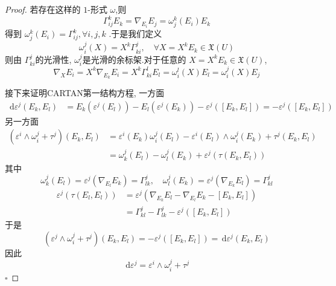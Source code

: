 \documentclass[../../几何与拓扑.tex]{subfiles}
\begin{document}
\begin{proof}
    若存在这样的 \(  1  \)-形式 \(   \omega   \),则 \[
   \Gamma _{ij}^{k}E_{k}=    \nabla _{E_{i}}E_{j}=  \omega _{j}^{k}\left( E_{i} \right)E_{k} 
    \]  得到 \(   \omega _{j}^{k}\left( E_{i} \right)=  \Gamma _{ij}^{k},\forall i,j,k   \) .于是我们定义 \[
     \omega _{i}^{j}\left( X \right)=X^{k} \Gamma _{ki}^{j},\quad \forall X = X^{k}E_{k} \in \mathfrak{X}\left( U \right) 
    \]则由 \(   \Gamma _{ki}^{j}  \)的光滑性, \(   \omega _{i}^{j}  \)是光滑的余标架.对于任意的 \(  X =  X^{k}E_{k} \in \mathfrak{X}\left( U \right)   \), \[
     \nabla _{X}E_{i}= X^{k} \nabla _{E_{k}}E_{i}= X^{k} \Gamma _{ki}^{l}E_{l}=  \omega _{i}^{l}\left( X \right)E_{l}=  \omega _{i}^{j}\left( X \right) E_{j} 
    \]   

    接下来证明CARTAN第一结构方程, 一方面 \[
    \begin{aligned}
    \,\mathrm{d}  \varepsilon ^{j}\left( E_{k},E_{l} \right)&=   E_{k}\left(  \varepsilon ^{j}\left( E_{l} \right)  \right)- E_{l}\left(  \varepsilon ^{j}\left( E_{k} \right)  \right) - \varepsilon ^{j}\left( \left[ E_{k},E_{l} \right]  \right) = - \varepsilon ^{j}\left( \left[ E_{k},E_{l} \right]  \right) 
    \end{aligned}
    \]另一方面 \[
    \begin{aligned}
 \left(     \varepsilon ^{i}\wedge  \omega _{i}^{j}+ \tau ^{j} \right)\left( E_{k},E_{l} \right)&=    \varepsilon ^{i}\left( E_{k} \right) \omega _{i}^{j}\left( E_{l} \right)-  \varepsilon  ^{i}\left( E_{l} \right)\wedge  \omega _{i}^{j}\left( E_{k} \right)+ \tau ^{j}\left( E_{k},E_{l} \right)\\ 
  &=  \omega _{k}^{j}\left( E_{l} \right)- \omega _{l}^{j}  \left( E_{k} \right)      +  \varepsilon ^{j}\left( \tau \left( E_{k},E_{l} \right)  \right) 
    \end{aligned}
    \]其中 \[
     \omega _{k}^{j}\left( E_{l} \right)=  \varepsilon ^{j}\left(  \nabla _{E_{l}}E_{k} \right)=  \Gamma _{lk}^{j},\quad  \omega _{l}^{j}\left( E_{k} \right)=  \varepsilon ^{j}\left(  \nabla _{E_{k}}E_{l} \right)=  \Gamma _{kl}^{j}    
    \] \[
 \begin{aligned}
    \varepsilon ^{j}\left( \tau \left( E_{l},E_{l}\right)  \right)&=  \varepsilon ^{j}\left(  \nabla _{E_{k}}E_{l}- \nabla _{E_{l}}E_{k}-\left[ E_{k},E_{l} \right]  \right)  \\ 
     &=   \Gamma _{kl}^{j}- \Gamma _{lk}^{j}- \varepsilon ^{j}\left( \left[ E_{k} ,E_{l}\right]  \right) 
 \end{aligned}
    \]
于是 \[
\left(  \varepsilon ^{j}\wedge  \omega _{i}^{j}+ \tau ^{j} \right)\left( E_{k},E_{l} \right)= - \varepsilon ^{j}\left( \left[ E_{k},E_{l} \right]  \right)= \,\mathrm{d}  \varepsilon ^{j}\left( E_{k},E_{l} \right)    
\]因此 \[
\,\mathrm{d}  \varepsilon ^{j}=  \varepsilon ^{i} \wedge \omega _{i}^{j}+ \tau ^{j}
\]
    \hfill $\square$
\end{proof}
\hspace*{\fill} 
\end{document}

